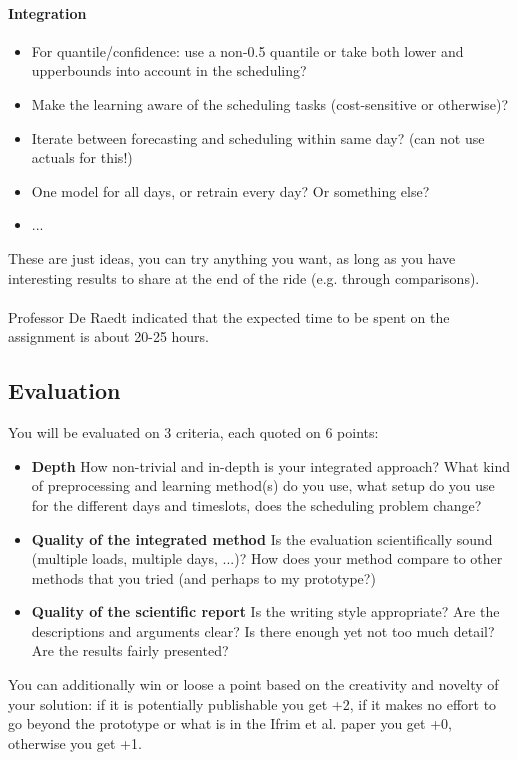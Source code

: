 \documentclass[a4,12pt]{article}
\begin{document}
\paragraph{Integration}
\begin{itemize}
\item For quantile/confidence: use a non-0.5 quantile or take both lower and upperbounds into account in the scheduling?
\item Make the learning aware of the scheduling tasks (cost-sensitive or otherwise)?
\item Iterate between forecasting and scheduling within same day? (can not use actuals for this!)
\item One model for all days, or retrain every day? Or something else?
\item ...
\end{itemize}

These are just ideas, you can try anything you want, as long as you have interesting results to share at the end of the ride (e.g. through comparisons).

\paragraph{}
Professor De Raedt indicated that the expected time to be spent on the assignment is about 20-25 hours.

\subsection*{Evaluation}
You will be evaluated on 3 criteria, each quoted on 6 points:
\begin{itemize}
\item \textbf{Depth} How non-trivial and in-depth is your integrated approach? What kind of preprocessing and learning method(s) do you use, what setup do you use for the different days and timeslots, does the scheduling problem change?
\item \textbf{Quality of the integrated method} Is the evaluation scientifically sound (multiple loads, multiple days, ...)? How does your method compare to other methods that you tried (and perhaps to my prototype?)
\item \textbf{Quality of the scientific report} Is the writing style appropriate? Are the descriptions and arguments clear? Is there enough yet not too much detail? Are the results fairly presented?
\end{itemize}
You can additionally win or loose a point based on the creativity and novelty of your solution: if it is potentially publishable you get +2, if it makes no effort to go beyond the prototype or what is in the Ifrim et al. paper you get +0, otherwise you get +1.
\end{document}
